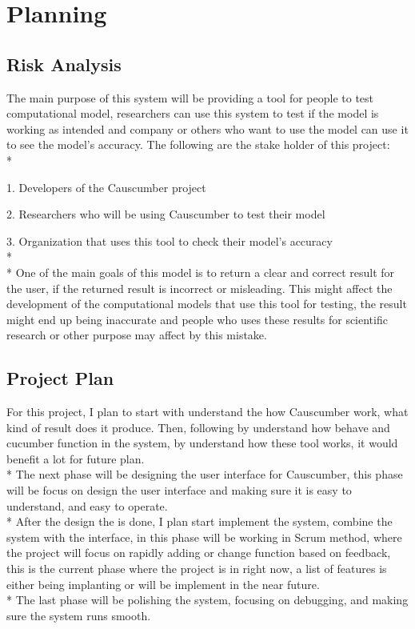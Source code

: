 \chapter{Planning}

\section{Risk Analysis}

The main purpose of this system will be providing a tool for people to test computational model, researchers can use this system to test if the model is working as intended and company or others who want to use the model can use it to see the model’s accuracy. The following are the stake holder of this project:\\*

1.	Developers of the Causcumber project

2.	Researchers who will be using Causcumber to test their model

3.	Organization that uses this tool to check their model’s accuracy
\\*
\\*
One of the main goals of this model is to return a clear and correct result for the user, if the returned result is incorrect or misleading. This might affect the development of the computational models that use this tool for testing, the result might end up being inaccurate and people who uses these results for scientific research or other purpose may affect by this mistake. 

\section{Project Plan}

For this project, I plan to start with understand the how Causcumber work, what kind of result does it produce. Then, following by understand how behave and cucumber function in the system, by understand how these tool works, it would benefit a lot for future plan. \\*
The next phase will be designing the user interface for Causcumber, this phase will be focus on design the user interface and making sure it is easy to understand, and easy to operate. \\*
After the design the is done, I plan start implement the system, combine the system with the interface, in this phase will be working in Scrum method, where the project will focus on rapidly adding or change function based on feedback, this is the current phase where the project is in right now, a list of features is either being implanting or will be implement in the near future. \\*
The last phase will be polishing the system, focusing on debugging, and making sure the system runs smooth. 

